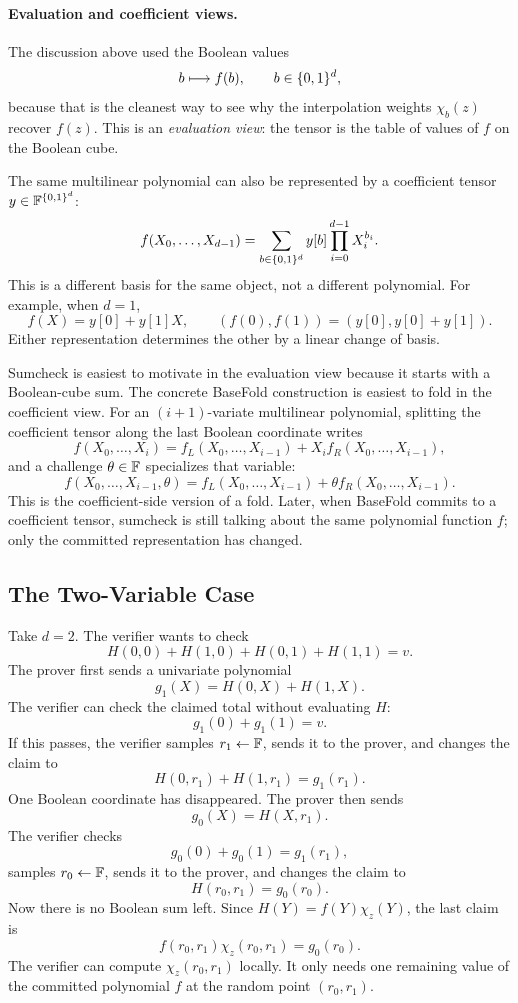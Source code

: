 \paragraph{Evaluation and coefficient views.}
The discussion above used the Boolean values
\[
  b\longmapsto f(b),
  \qquad b\in\{0,1\}^d,
\]
because that is the cleanest way to see why the interpolation weights
$\chi_b(z)$ recover $f(z)$.  This is an \emph{evaluation view}: the tensor is
the table of values of $f$ on the Boolean cube.

The same multilinear polynomial can also be represented by a coefficient tensor
$y\in\mathbb{F}^{\{0,1\}^d}$:
\[
  f(X_0,\ldots,X_{d-1})
  =
  \sum_{b\in\{0,1\}^d} y[b]\prod_{i=0}^{d-1}X_i^{b_i}.
\]
This is a different basis for the same object, not a different polynomial.  For
example, when $d=1$,
\[
  f(X)=y[0]+y[1]X,
  \qquad
  (f(0),f(1))=(y[0],y[0]+y[1]).
\]
Either representation determines the other by a linear change of basis.

Sumcheck is easiest to motivate in the evaluation view because it starts with a
Boolean-cube sum.  The concrete BaseFold construction is easiest to fold in the
coefficient view.  For an $(i+1)$-variate multilinear polynomial, splitting the
coefficient tensor along the last Boolean coordinate writes
\[
  f(X_0,\ldots,X_i)
  =
  f_L(X_0,\ldots,X_{i-1})
  +
  X_i f_R(X_0,\ldots,X_{i-1}),
\]
and a challenge $\theta\in\mathbb{F}$ specializes that variable:
\[
  f(X_0,\ldots,X_{i-1},\theta)
  =
  f_L(X_0,\ldots,X_{i-1})
  +
  \theta f_R(X_0,\ldots,X_{i-1}).
\]
This is the coefficient-side version of a fold.  Later, when BaseFold commits to
a coefficient tensor, sumcheck is still talking about the same polynomial
function $f$; only the committed representation has changed.

\subsection{The Two-Variable Case}

Take $d=2$.  The verifier wants to check
\[
  H(0,0)+H(1,0)+H(0,1)+H(1,1)=v.
\]
The prover first sends a univariate polynomial
\[
  g_1(X)=H(0,X)+H(1,X).
\]
The verifier can check the claimed total without evaluating $H$:
\[
  g_1(0)+g_1(1)=v.
\]
If this passes, the verifier samples $r_1\leftarrow\mathbb{F}$, sends it to the prover,
and changes the claim to
\[
  H(0,r_1)+H(1,r_1)=g_1(r_1).
\]
One Boolean coordinate has disappeared.  The prover then sends
\[
  g_0(X)=H(X,r_1).
\]
The verifier checks
\[
  g_0(0)+g_0(1)=g_1(r_1),
\]
samples $r_0\leftarrow\mathbb{F}$, sends it to the prover, and changes the claim to
\[
  H(r_0,r_1)=g_0(r_0).
\]
Now there is no Boolean sum left.  Since $H(Y)=f(Y)\chi_z(Y)$, the last claim is
\[
  f(r_0,r_1)\chi_z(r_0,r_1)=g_0(r_0).
\]
The verifier can compute $\chi_z(r_0,r_1)$ locally.  It only needs one
remaining value of the committed polynomial $f$ at the random point
$(r_0,r_1)$.

